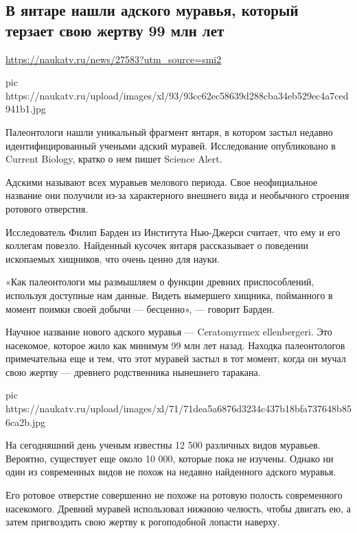  
 

\subsection{В янтаре нашли адского муравья, который терзает свою жертву 99 млн лет}
\label{sec:07_08_2020.news.ru.nauka_tv.1_muravei_ad}

\url{https://naukatv.ru/news/27583?utm_source=smi2}

\ifcmt
  pic https://naukatv.ru/upload/images/xl/93/93cc62ec58639d288cba34eb529ec4a7ced941b1.jpg
\fi

Палеонтологи нашли уникальный фрагмент янтаря, в котором застыл недавно
идентифицированный учеными адский муравей. Исследование опубликовано в Current
Biology, кратко о нем пишет Science Alert.

Адскими называют всех муравьев мелового периода. Свое неофициальное название
они получили из-за характерного внешнего вида и необычного строения ротового
отверстия.

Исследователь Филип Барден из Института Нью-Джерси считает, что ему и его
коллегам повезло. Найденный кусочек янтаря рассказывает о поведении ископаемых
хищников, что очень ценно для науки.

«Как палеонтологи мы размышляем о функции древних приспособлений, используя
доступные нам данные. Видеть вымершего хищника, пойманного в момент поимки
своей добычи --- бесценно», --- говорит Барден.

Научное название нового адского муравья --- Ceratomyrmex ellenbergeri. Это
насекомое, которое жило как минимум 99 млн лет назад. Находка палеонтологов
примечательна еще и тем, что этот муравей застыл в тот момент, когда он мучал
свою жертву --- древнего родственника нынешнего таракана.

\ifcmt
pic https://naukatv.ru/upload/images/xl/71/71dea5a6876d3234c437b18bfa737648b856ca2b.jpg
\fi

На сегодняшний день ученым известны 12 500 различных видов муравьев. Вероятно,
существует еще около 10 000, которые пока не изучены. Однако ни один из
современных видов не похож на недавно найденного адского муравья.

Его ротовое отверстие совершенно не похоже на ротовую полость современного
насекомого. Древний муравей использовал нижнюю челюсть, чтобы двигать ею, а
затем пригвоздить свою жертву к рогоподобной лопасти наверху.

